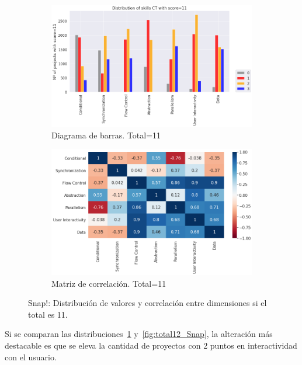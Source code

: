 \documentclass[a4paper, 12pt]{book}
\begin{document}
\begin{figure}[H]
    \centering
    \begin{subfigure}[h]{.49\textwidth} 
        \includegraphics[width=\textwidth]{img/distribucion_11_Snap}
        \caption{Diagrama de barras. Total=11}
        \label{fig:total11_Snap}
    \end{subfigure}       
    \begin{subfigure}[h]{.49\textwidth} 
        \includegraphics[width=\textwidth]{img/corr_11_Snap}
        \caption{Matriz de correlación. Total=11}
        \label{fig:corr11_Snap}
    \end{subfigure}
    \caption{Snap!: Distribución de valores y correlación entre dimensiones si el total es 11.}
\end{figure}

Si se comparan las distribuciones~\ref{fig:total11_Snap} y~\ref{fig:total12_Snap}, la alteración más destacable es que se eleva la cantidad de proyectos con 2 puntos en interactividad con el usuario.
\end{document}
